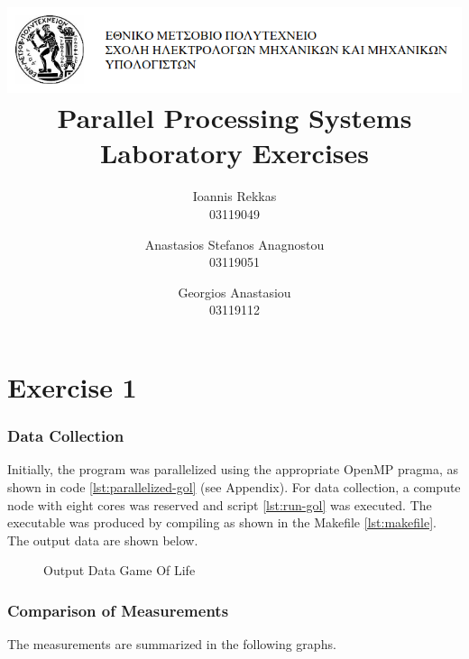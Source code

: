 \documentclass{article}
\title{
    \includegraphics[width=\textwidth]{../emp.png} \\
    \vskip 5cm
    Parallel Processing Systems \\
    \large Laboratory Exercises
    \vskip 5cm
}
\author{
    Ioannis Rekkas \\ \large 03119049 \and
    Anastasios Stefanos Anagnostou \\ \large 03119051 \and
    Georgios Anastasiou \\ \large 03119112
}
\newcommand{\eng}[1]{#1}
\begin{document}
\maketitle
\clearpage
\tableofcontents
\clearpage

\part{Exercise 1}
\section{Data Collection}

Initially, the program was parallelized using the appropriate \eng{OpenMP} pragma, as shown in code \ref{lst:parallelized-gol} (see Appendix). For data collection, a compute node with eight cores was reserved and script \ref{lst:run-gol} was executed. The executable was produced by compiling as shown in the \eng{Makefile} \ref{lst:makefile}. The output data are shown below.

\begin{figure}[h]
    
    \caption{Output Data \eng{Game Of Life}}
\end{figure}
\FloatBarrier

\clearpage
\section{Comparison of Measurements}

The measurements are summarized in the following graphs.
\end{document}
